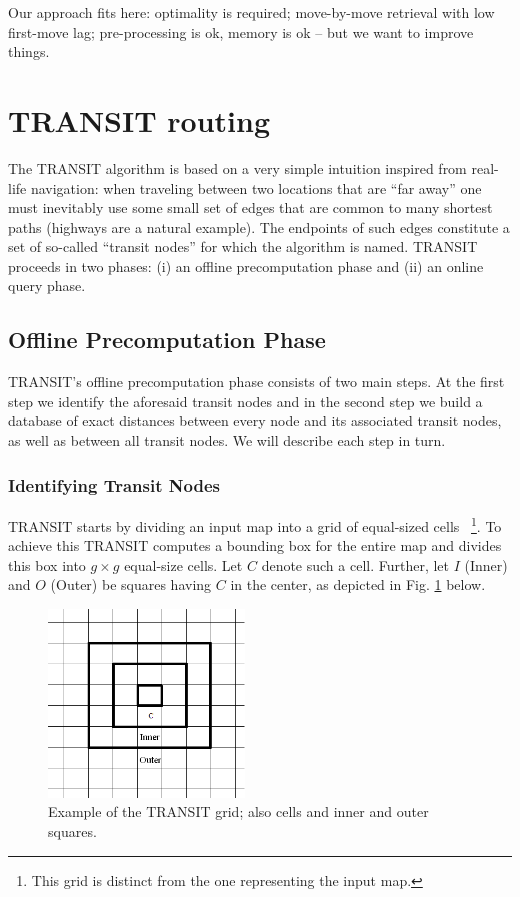 \documentclass[runningheads,a4paper]{llncs}
\begin{document}
Our approach fits here: optimality is required; move-by-move retrieval with low
first-move lag; pre-processing is ok, memory is ok -- but we want to improve
things.


\section{TRANSIT routing}\label{sec:transit}


The TRANSIT algorithm is based on a very simple intuition inspired from real-life navigation: when traveling
between two locations that are ``far away'' one must inevitably use some small set of edges that
are common to many shortest paths (highways are a natural example).
The endpoints of such edges constitute a set of so-called ``transit nodes'' for which the algorithm is named.
TRANSIT proceeds in two phases: (i) an offline precomputation phase and (ii) an online query phase.

\subsection {Offline Precomputation Phase}\label{sub:precomputation}
TRANSIT's offline precomputation phase consists of two main steps. At the first step we identify the aforesaid transit nodes
and in the second step we build a database of exact distances between every node and its associated transit nodes, as well as between all transit nodes.
We will describe each step in turn.

\subsubsection{Identifying Transit Nodes}\label{sub:determine}
TRANSIT starts by dividing an input map into a grid of equal-sized cells~
\footnote{ This grid is distinct from the one representing the input map.}.
To achieve this TRANSIT computes a bounding box for the entire map and divides this box
into $g \times g$ equal-size cells. Let $C$ denote such a cell. Further, let $I$ (Inner) and $O$ (Outer)
be squares having $C$ in the center, as depicted in Fig. \ref{fig:example} below.

\begin{figure}[H]
\centering
\includegraphics[height=5cm]{transit_example3.PNG}
\caption{Example of the TRANSIT grid; also cells and inner and outer squares. }
\label{fig:example}
\end{figure}
\end{document}
